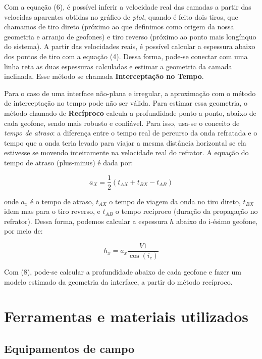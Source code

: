 \documentclass[a4paper,12pt]{article}
\begin{document}
Com a equação (6), é possível inferir a velocidade real das camadas a partir das velocidas aparentes obtidas no gráfico de \textit{plot}, quando é feito dois tiros, que chamamos de tiro direto (próximo ao que definimos como origem da nossa geometria e arranjo de geofones) e tiro reverso (próximo ao ponto mais longínquo do sistema). A partir das velocidades reais, é possível calcular a espessura abaixo dos pontos de tiro com  a equação (4). Dessa forma, pode-se conectar com uma linha reta as duas espessuras calculadas e estimar a geometria da camada inclinada. Esse método se chamada \textbf{Interceptação no Tempo}. 


Para o caso de uma interface não-plana e irregular, a aproximação com o método de interceptação no tempo pode não ser válida. Para estimar essa geometria, o método chamado de \textbf{Recíproco} calcula a profundidade ponto a ponto, abaixo de cada geofone, sendo mais robusto e confiável. Para isso, usa-se o conceito de \textit{tempo de atraso}: a diferença entre o tempo real de percurso da onda refratada e o tempo que a onda teria levado para viajar a mesma distância horizontal se ela estivesse se movendo inteiramente na velocidade real do refrator. A equação do tempo de atraso (plus-minus) é dada por:

\begin{equation}
    a_X = \frac{1}{2} (t_{AX} + t_{BX} - t_{AB}) 
\end{equation}

\noindent
onde $a_x$ é o tempo de atraso, $t_{AX}$ o tempo de viagem da onda no tiro direto, $t_{BX}$ idem mas para o tiro reverso, e $t_{AB}$ o tempo recíproco (duração da propagação no refrator). Dessa forma, podemos calcular a espessura $h$ abaixo do i-ésimo geofone, por meio de:

\begin{equation}
    h_x = a_x \frac{V1}{\cos(i_c)}
\end{equation}

Com (8), pode-se calcular a profundidade abaixo de cada geofone e fazer um modelo estimado da geometria da interface, a partir do método recíproco. 


\section{Ferramentas e materiais utilizados}

\subsection{Equipamentos de campo}
\end{document}
